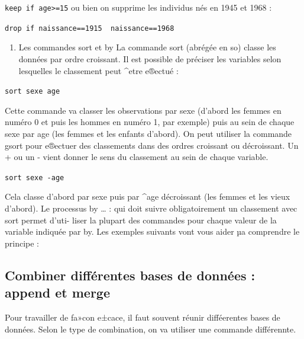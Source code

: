 \documentclass[
]{book}
\providecommand{\tightlist}{%
  \setlength{\itemsep}{0pt}\setlength{\parskip}{0pt}}
\begin{document}
\texttt{keep\ if\ age\textgreater{}=15}
ou bien on supprime les individus nés en 1945 et 1968 :

\texttt{drop\ if\ naissance==1915\ \textbar{}\ naissance==1968}

\begin{enumerate}
\def\labelenumi{(\arabic{enumi})}
\setcounter{enumi}{4}
\tightlist
\item
  Les commandes sort et by
  La commande sort (abrégée en so) classe les données par ordre croissant. Il est possible de
  préciser les variables selon lesquelles le classement peut \^{}etre e®ectué :
\end{enumerate}

\texttt{sort\ sexe\ age}

Cette commande va classer les observations par sexe (d'abord les femmes en numéro 0 et puis
les hommes en numéro 1, par exemple) puis au sein de chaque sexe par age (les femmes et les
enfants d'abord). On peut utiliser la commande gsort pour e®ectuer des classements dans des
ordres croissant ou décroissant. Un + ou un - vient donner le sens du classement au sein de chaque
variable.

\texttt{sort\ sexe\ -age}

Cela classe d'abord par sexe puis par \^{}age décroissant (les femmes et les vieux d'abord).
Le processus by \ldots{} : qui doit suivre obligatoirement un classement avec sort permet d'uti-
liser la plupart des commandes pour chaque valeur de la variable indiquée par by. Les exemples
suivants vont vous aider µa comprendre le principe :

\hypertarget{combiner-diffuxe9rentes-bases-de-donnuxe9es-append-et-merge}{%
\subsection{Combiner différentes bases de données : append et merge}\label{combiner-diffuxe9rentes-bases-de-donnuxe9es-append-et-merge}}

Pour travailler de fa»con e±cace, il faut souvent réunir difféerentes bases de données. Selon le type de combination, on va utiliser une commande différennte.
\end{document}
